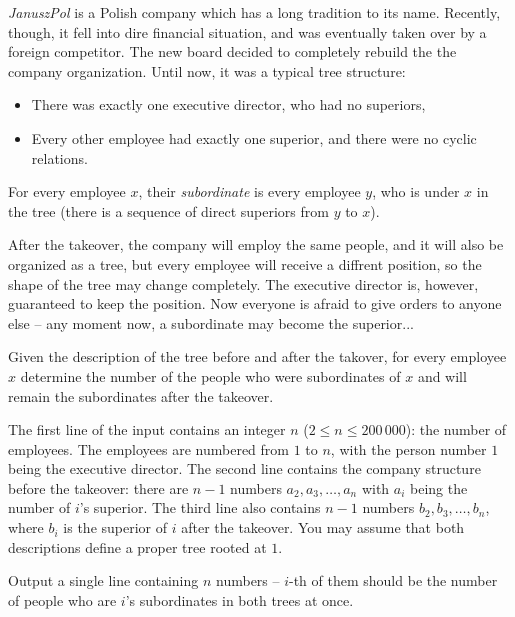 




\textit{JanuszPol} is a Polish company which has a long tradition to its name. Recently, though, it fell into dire financial situation, and was eventually taken over by a foreign competitor. The new board decided to completely rebuild the the company organization. Until now, it was a typical tree structure:

\begin{itemize}
 \item There was exactly one executive director, who had no superiors,
 \item Every other employee had exactly one superior, and there were no cyclic relations.
\end{itemize}

For every employee $x$, their \textit{subordinate} is every employee $y$, who is under $x$ in the tree (there is a sequence of direct superiors from $y$ to $x$).

After the takeover, the company will employ the same people, and it will also be organized as a tree, but every employee will receive a diffrent position, so the shape of the tree may change completely. The executive director is, however, guaranteed to keep the position. Now everyone is afraid to give orders to anyone else -- any moment now, a subordinate may become the superior...


Given the description of the tree before and after the takover, for every employee $x$ determine the number of the people who were subordinates of $x$ and will remain the subordinates after the takeover.


The first line of the input contains an integer $n$ ($2 \leq n \leq 200\,000$): the number of employees. The employees are numbered from $1$ to $n$, with the person number $1$ being the executive director. The second line contains the company structure before the takeover: there are $n-1$ numbers $a_2, a_3, \ldots, a_n$ with $a_i$ being the number of $i$'s superior. The third line also contains $n-1$ numbers $b_2, b_3, \ldots, b_n$, where $b_i$ is the superior of $i$ after the takeover. You may assume that both descriptions define a proper tree rooted at $1$.


Output a single line containing $n$ numbers -- $i$-th of them should be the number of people who are $i$'s subordinates in both trees at once.

